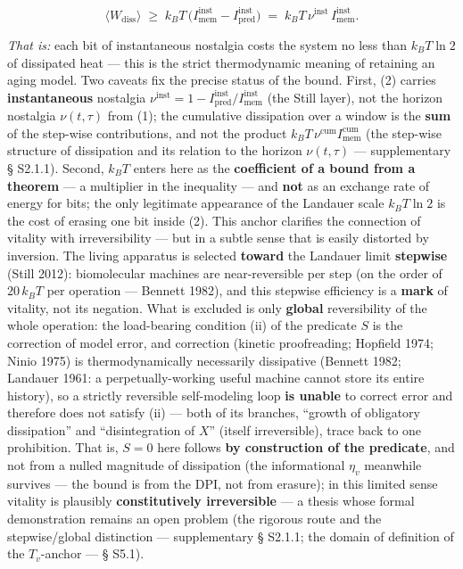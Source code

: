 \documentclass[pdflatex,sn-mathphys-ay]{sn-jnl}
\begin{document}
\begin{equation}\langle W_{\text{diss}} \rangle \;\ge\; k_B T\,\big(I_{\text{mem}}^{\text{inst}} - I_{\text{pred}}^{\text{inst}}\big)
  \;=\; k_B T\,\nu^{\text{inst}}\,I_{\text{mem}}^{\text{inst}}. \tag{2}\end{equation}

\emph{That is:} each bit of instantaneous nostalgia costs the system no less than \(k_B T \ln 2\) of dissipated heat --- this is the strict thermodynamic meaning of retaining an aging model. Two caveats fix the precise status of the bound. First, (2) carries \textbf{instantaneous} nostalgia \(\nu^{\text{inst}} = 1 - I_{\text{pred}}^{\text{inst}}/I_{\text{mem}}^{\text{inst}}\) (the Still layer), not the horizon nostalgia \(\nu(t,\tau)\) from (1); the cumulative dissipation over a window is the \textbf{sum} of the step-wise contributions, and not the product \(k_B T\,\nu^{\text{cum}} I_{\text{mem}}^{\text{cum}}\) (the step-wise structure of dissipation and its relation to the horizon \(\nu(t,\tau)\) --- supplementary § S2.1.1). Second, \(k_B T\) enters here as the \textbf{coefficient of a bound from a theorem} --- a multiplier in the inequality --- and \textbf{not} as an exchange rate of energy for bits; the only legitimate appearance of the Landauer scale \(k_B T \ln 2\) is the cost of erasing one bit inside (2). This anchor clarifies the connection of vitality with irreversibility --- but in a subtle sense that is easily distorted by inversion. The living apparatus is selected \textbf{toward} the Landauer limit \textbf{stepwise} (Still 2012): biomolecular machines are near-reversible per step (on the order of \(20\,k_B T\) per operation --- Bennett 1982), and this stepwise efficiency is a \textbf{mark} of vitality, not its negation. What is excluded is only \textbf{global} reversibility of the whole operation: the load-bearing condition (ii) of the predicate \(S\) is the correction of model error, and correction (kinetic proofreading; Hopfield 1974; Ninio 1975) is thermodynamically necessarily dissipative (Bennett 1982; Landauer 1961: a perpetually-working useful machine cannot store its entire history), so a strictly reversible self-modeling loop \textbf{is unable} to correct error and therefore does not satisfy (ii) --- both of its branches, ``growth of obligatory dissipation'' and ``disintegration of \(X\)'' (itself irreversible), trace back to one prohibition. That is, \(S = 0\) here follows \textbf{by construction of the predicate}, and not from a nulled magnitude of dissipation (the informational \(\eta_v\) meanwhile survives --- the bound is from the DPI, not from erasure); in this limited sense vitality is plausibly \textbf{constitutively irreversible} --- a thesis whose formal demonstration remains an open problem (the rigorous route and the stepwise/global distinction --- supplementary § S2.1.1; the domain of definition of the \(T_v\)-anchor --- § S5.1).
\end{document}
